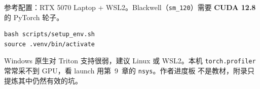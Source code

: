 参考配置：RTX 5070 Laptop + WSL2。Blackwell（\texttt{sm\_120}）需要 \textbf{CUDA 12.8} 的 PyTorch 轮子。

\begin{runcmd}[本仓库环境]
\begin{lstlisting}[style=shell]
bash scripts/setup_env.sh
source .venv/bin/activate
\end{lstlisting}
\end{runcmd}

\begin{remark}
Windows 原生对 Triton 支持很弱，建议 Linux 或 WSL2。本机 \texttt{torch.profiler} 常常采不到 GPU，看 launch 用第~9~章的 \texttt{nsys}。作者进度板  不是教材，附录只提炼其中仍然有效的坑。
\end{remark}
